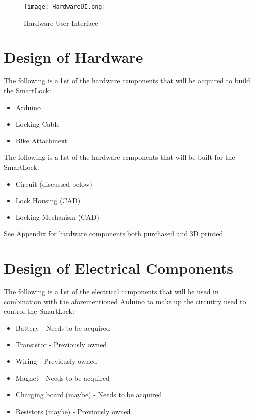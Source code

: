 \documentclass[12pt, titlepage]{article}
\begin{document}
 \begin{figure}[h!]
 \begin{center}
 {
  \texttt{[image: HardwareUI.png]}
 }
 \caption{\label{Hardware User Interface} Hardware User Interface}
 \end{center}
 \end{figure}


\section{Design of Hardware}

The following is a list of the hardware components that will be acquired to build the SmartLock:
\begin{itemize}
\item Arduino
\item Locking Cable
\item Bike Attachment
\end{itemize}

The following is a list of the hardware components that will be built for the SmartLock:
\begin{itemize}
\item Circuit (discussed below)
\item Lock Housing (CAD)
\item Locking Mechanism (CAD)
\end{itemize}

See Appendix for hardware components both purchased and 3D printed


\section{Design of Electrical Components}

The following is a list of the electrical components that will be used in combination with the aforementioned Arduino to make up the circuitry used to control the SmartLock:
\begin{itemize}
\item Battery
\subitem - Needs to be acquired
\item Transistor
\subitem - Previously owned
\item Wiring
\subitem - Previously owned
\item Magnet
\subitem - Needs to be acquired
\item Charging board (maybe)
\subitem - Needs to be acquired
\item Resistors (maybe)
\subitem - Previously owned
\end{itemize}
\end{document}
